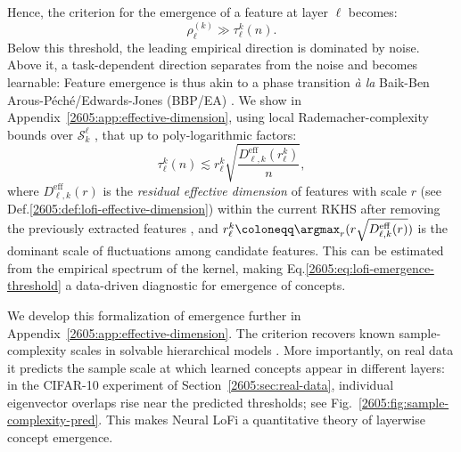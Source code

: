 Hence, the criterion for the emergence of a feature at layer $\ell$ becomes:
\begin{equation}
    \rho_\ell^{(k)}
    \gg
    \tau^k_\ell(n) .
    \label{2605:eq:lofi-emergence-threshold}
\end{equation}
Below this threshold, the leading empirical direction is dominated by noise. Above it, a task-dependent direction separates from the noise and becomes learnable: Feature emergence is thus akin to a phase transition {\it \`a la} Baik-Ben Arous-P{\'e}ch{\'e}/Edwards-Jones (BBP/EA) \cite{baik2005phase,edwards1976eigenvalue}.  
We show in Appendix~\ref{2605:app:effective-dimension}, using local Rademacher-complexity bounds over $\mathcal{S}^\ell_{k}$ \cite{mendelson2003performance,bartlett2005local}, that up to poly-logarithmic factors:
\begin{equation}\label{2605:eq:emergence_feature}
     \tau_\ell^k(n)
    \lesssim
    r^k_{\ell}\sqrt{\frac{D_{\ell,k}^{\mathrm{eff}}(r^k_{\ell})}{n}},
\end{equation}
where \(D_{\ell,k}^{\mathrm{eff}}(r)\) is the {\it residual effective dimension} of features with scale $r$ (see Def.\ref{2605:def:lofi-effective-dimension}) within the current RKHS after removing the previously extracted features \cite{caponnetto2007optimal,rudi2017generalization}, and $r^k_{\ell}\coloneqq \argmax_{r} (r \sqrt{D_{\ell,k}^{\mathrm{eff}}(r)})$ is the dominant scale of fluctuations among candidate features. This can be estimated from the empirical spectrum of the kernel, making Eq.\eqref{2605:eq:lofi-emergence-threshold} a data-driven diagnostic for emergence of concepts. 

We develop this formalization of emergence further in Appendix~\ref{2605:app:effective-dimension}. The criterion recovers known sample-complexity scales in solvable hierarchical models
\cite{defilippis2026optimal,tabanelli2026deep,nichani2023provable,wang2024learning,fu2025learning}. More importantly, on real data it predicts the sample scale at which learned concepts appear in different layers: in the CIFAR-10 experiment of Section~\ref{2605:sec:real-data}, individual eigenvector overlaps rise near the predicted thresholds; see Fig.~\ref{2605:fig:sample-complexity-pred}. This makes Neural LoFi a quantitative theory of layerwise concept emergence.

